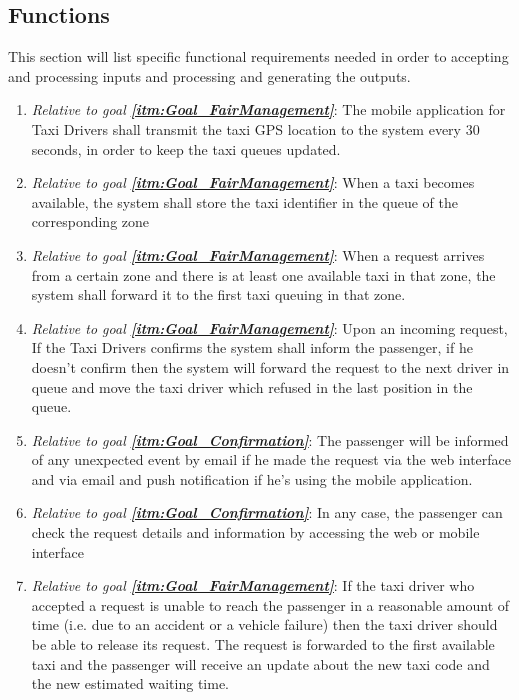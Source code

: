 \documentclass[11pt, a4paper,titlepage]{article}
\newcommand{\linkitm}[1]{\underline{\textbf{\ref{#1}}}}
\begin{document}
\subsection{Functions} %
This section will list specific functional requirements needed in order to accepting and processing inputs and processing and generating the outputs.
	\begin{enumerate}
		\item \textit{Relative to goal \linkitm{itm:Goal_FairManagement}}: The mobile application for Taxi Drivers shall transmit the taxi GPS location to the system every 30 seconds, in order to keep the taxi queues updated.
		\item \textit{Relative to goal \linkitm{itm:Goal_FairManagement}}: When a taxi becomes available, the system shall store the taxi identifier in the queue of the corresponding zone
		\item \textit{Relative to goal \linkitm{itm:Goal_FairManagement}}: When a request arrives from a certain zone and there is at least one available taxi in that zone, the system shall forward it to the first taxi queuing in that zone.
		\item \textit{Relative to goal \linkitm{itm:Goal_FairManagement}}: Upon an incoming request, If the Taxi Drivers confirms  the system shall inform the passenger, if he doesn’t confirm then the system will forward the request to the next driver in queue and move the taxi driver which refused in the last position in the queue.
		\item \textit{Relative to goal \linkitm{itm:Goal_Confirmation}}: The passenger will be informed of any unexpected event by email if he made the request via the web interface and via email and push notification if he’s using the mobile application. 
		\item \textit{Relative to goal \linkitm{itm:Goal_Confirmation}}: In any case, the passenger can check the request details and information by accessing the web or mobile interface
		\item \textit{Relative to goal \linkitm{itm:Goal_FairManagement}}: If the taxi driver who accepted a request is unable to reach the passenger in a reasonable amount of time (i.e. due to an accident or a vehicle failure) then the taxi driver should be able to release its request. The request is forwarded to the first available taxi and the passenger will receive an update about the new taxi code and the new estimated waiting time.

\end{enumerate}
\end{document}
